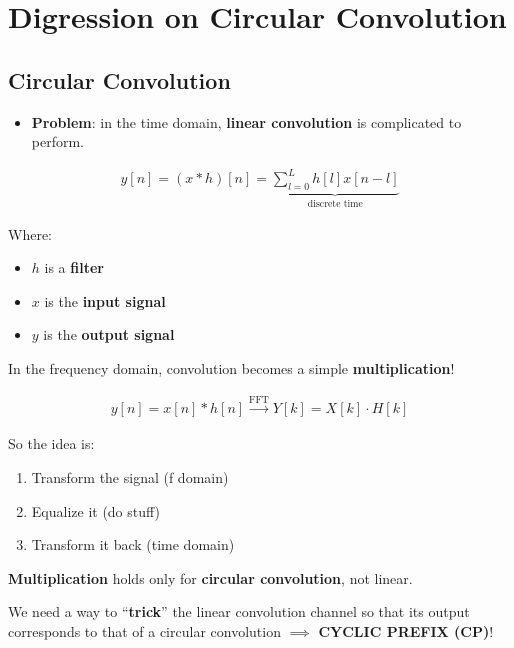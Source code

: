 \documentclass[a4paper, 12pt]{book}
\begin{document}
\setcounter{chapter}{5}
\chapter{Digression on Circular Convolution}
\section{Circular Convolution}

\begin{itemize}
    \item \textbf{Problem}: in the time domain, \textbf{linear convolution} is complicated to perform.
\end{itemize}

\begin{align}
    y[n] = (x * h)[n] = \underbrace{\sum_{l=0}^{L} h[l]x[n-l]}_{\text{discrete time}}
\end{align}

Where:
\begin{itemize}
    \item $h$ is a \textbf{filter}
    \item $x$ is the \textbf{input signal}
    \item $y$ is the \textbf{output signal}
\end{itemize}

In the frequency domain, convolution becomes a simple \textbf{multiplication}!

\begin{align}
    y[n] = x[n] * h[n] \xrightarrow{\text{FFT}} Y[k] = X[k] \cdot H[k]
\end{align}

So the idea is:
\begin{enumerate}
    \item Transform the signal (f domain)
    \item Equalize it (do stuff)
    \item Transform it back (time domain)
\end{enumerate}

\begin{tcolorbox}[colframe=red, colback=white, title=\textbf{\faExclamationTriangle \ Attention}]
    \textbf{Multiplication} holds only for \textbf{circular convolution}, not linear.
\end{tcolorbox}

We need a way to ``\textbf{trick}'' the linear convolution channel so that its output corresponds to that of a circular convolution $\implies$ \textbf{CYCLIC PREFIX (CP)}!
\end{document}

